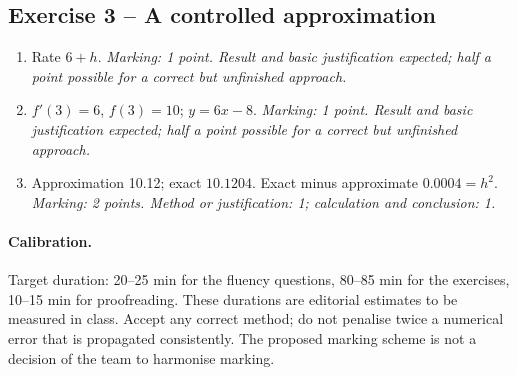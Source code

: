 \subsection*{Exercise 3 -- A controlled approximation}
\begin{enumerate}
\item Rate $6+h$. \textit{Marking: 1 point. Result and basic justification expected; half a point possible for a correct but unfinished approach.}
\item $f\prime(3)=6$, $f(3)=10$; $y=6x-8$. \textit{Marking: 1 point. Result and basic justification expected; half a point possible for a correct but unfinished approach.}
\item Approximation \num{10,12}; exact $\num{10,1204}$. Exact minus approximate $\num{0,0004}=h^2$. \textit{Marking: 2 points. Method or justification: 1; calculation and conclusion: 1.}
\end{enumerate}
\paragraph{Calibration.} Target duration: 20--25 min for the fluency questions, 80--85 min for the exercises, 10--15 min for proofreading. These durations are editorial estimates to be measured in class. Accept any correct method; do not penalise twice a numerical error that is propagated consistently. The proposed marking scheme is not a decision of the team to harmonise marking.
